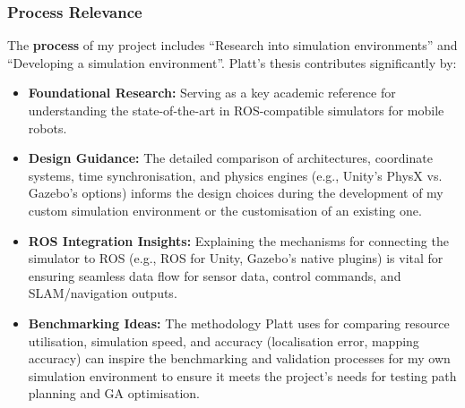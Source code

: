 \subsubsection{Process Relevance}
The \textbf{process} of my project includes ``Research into simulation environments'' and ``Developing a simulation environment''.
Platt's thesis contributes significantly by:
\begin{itemize}
    \item \textbf{Foundational Research:} Serving as a key academic reference for understanding the state-of-the-art in ROS-compatible simulators for mobile robots.
    \item \textbf{Design Guidance:} The detailed comparison of architectures, coordinate systems, time synchronisation, and physics engines (e.g., Unity's PhysX vs.
    Gazebo's options) informs the design choices during the development of my custom simulation environment or the customisation of an existing one.
    \item \textbf{ROS Integration Insights:} Explaining the mechanisms for connecting the simulator to ROS (e.g., ROS for Unity, Gazebo's native plugins) is vital for ensuring seamless data flow for sensor data, control commands, and SLAM/navigation outputs.
    \item \textbf{Benchmarking Ideas:} The methodology Platt uses for comparing resource utilisation, simulation speed, and accuracy (localisation error, mapping accuracy) can inspire the benchmarking and validation processes for my own simulation environment to ensure it meets the project's needs for testing path planning and GA optimisation.
\end{itemize}

